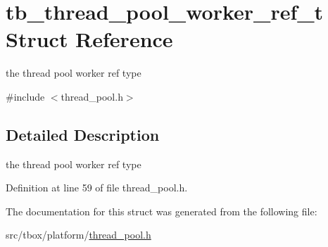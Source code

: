 \hypertarget{structtb__thread__pool__worker__ref__t}{\section{tb\-\_\-thread\-\_\-pool\-\_\-worker\-\_\-ref\-\_\-t Struct Reference}
\label{structtb__thread__pool__worker__ref__t}
}


the thread pool worker ref type  




{\ttfamily \#include $<$thread\-\_\-pool.\-h$>$}



\subsection{Detailed Description}
the thread pool worker ref type 

Definition at line 59 of file thread\-\_\-pool.\-h.



The documentation for this struct was generated from the following file\-:\begin{DoxyCompactItemize}
\item 
src/tbox/platform/\hyperlink{thread__pool_8h}{thread\-\_\-pool.\-h}\end{DoxyCompactItemize}
